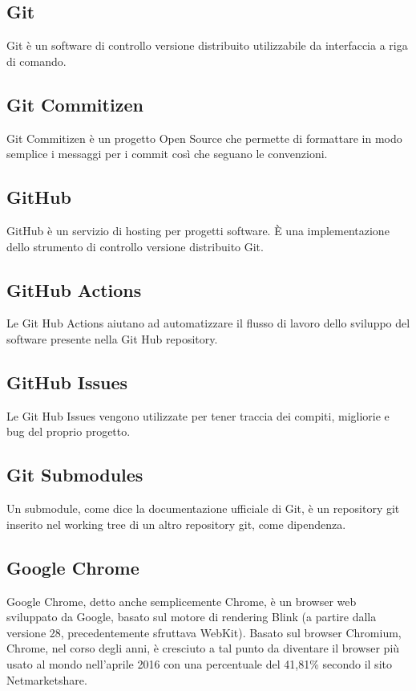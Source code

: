 
\subsection*{Git}
Git è un software di controllo versione distribuito utilizzabile da interfaccia a riga di comando.

\subsection*{Git Commitizen}
Git Commitizen è un progetto Open Source che permette di formattare in modo semplice i messaggi per i commit così che seguano le convenzioni.

\subsection*{GitHub}
GitHub è un servizio di hosting per progetti software. È una implementazione dello strumento di controllo versione distribuito Git.

\subsection*{GitHub Actions}
Le Git Hub Actions aiutano ad automatizzare il flusso di lavoro dello sviluppo del software presente nella Git Hub repository.

\subsection*{GitHub Issues}
Le Git Hub Issues vengono utilizzate per tener traccia dei compiti, migliorie e bug del proprio progetto.

\subsection*{Git Submodules}
Un submodule, come dice la documentazione ufficiale di Git, è un repository git inserito nel working tree di un altro repository git, come dipendenza.

\subsection*{Google Chrome}
Google Chrome, detto anche semplicemente Chrome, è un browser web sviluppato da Google, basato sul motore di rendering Blink (a partire dalla versione 28, precedentemente sfruttava WebKit).
Basato sul browser Chromium, Chrome, nel corso degli anni, è cresciuto a tal punto da diventare il browser più usato al mondo nell'aprile 2016 con una percentuale del 41,81\% secondo il sito Netmarketshare.

